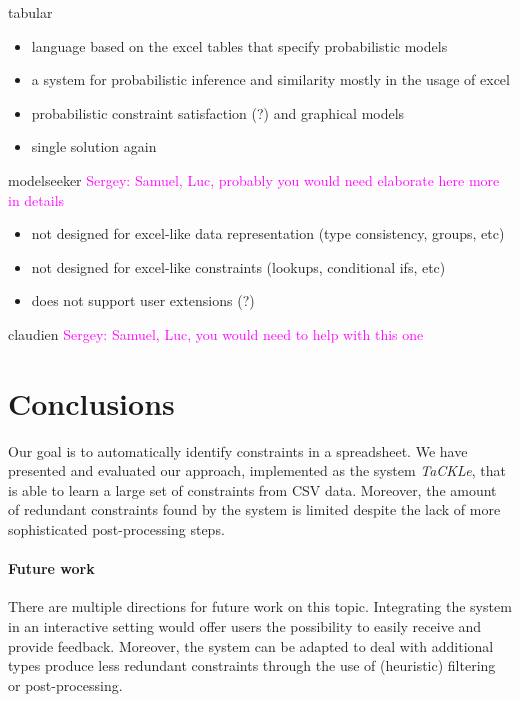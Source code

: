 \documentclass{sig-alternate-05-2015}
\newcommand{\sergey}[1]{\textcolor{magenta}{{\sc Sergey:} #1}\xspace}
\newcommand{\format}[1]{\textit{#1}\xspace}
\newcommand{\sname}{\format{TaCKLe}}
\begin{document}
tabular \cite{tabular}
\begin{itemize}
  \item language based on the excel tables that specify probabilistic models
  \item a system for probabilistic inference and similarity mostly in the usage of excel
  \item probabilistic constraint satisfaction (?) and graphical models
  \item single solution again
\end{itemize}

modelseeker \cite{modelseeker} \sergey{Samuel, Luc, probably you would need elaborate here more in details}

\begin{itemize}
  \item not designed for excel-like data representation (type consistency, groups, etc)
  \item not designed for excel-like constraints (lookups, conditional ifs, etc)
  \item does not support user extensions (?)
\end{itemize}

claudien \cite{claudien} \sergey{Samuel, Luc, you would need to help with this one}

\section{Conclusions}\label{sec:conclusions}

Our goal is to automatically identify constraints in a spreadsheet.
We have presented and evaluated our approach, implemented as the system \sname, that is able to learn a large set of constraints from CSV data.
Moreover, the amount of redundant constraints found by the system is limited despite the lack of more sophisticated post-processing steps.

\paragraph{Future work}
There are multiple directions for future work on this topic.
Integrating the system in an interactive setting would offer users the possibility to easily receive and provide feedback.
Moreover, the system can be adapted to deal with additional types produce less redundant constraints through the use of (heuristic) filtering or post-processing.
\end{document}
